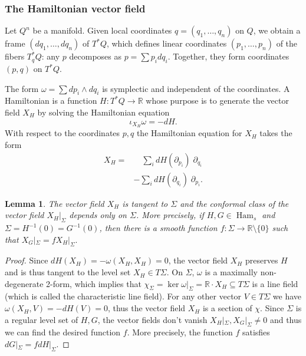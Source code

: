 \documentclass{amsart}
\newcommand{\RR}{\mathbb{R}}
\newcommand{\Ham}{\operatorname{Ham}}
\newtheorem{lemma}[proposition]{Lemma}
\theoremstyle{definition}
\theoremstyle{remark}
\numberwithin{equation}{section}
\begin{document}




\subsubsection{The Hamiltonian vector field}\label{subsubsec:HamVec}

Let $Q^n$ be a manifold. Given local coordinates $q=(q_1,\ldots,q_n)$ on $Q$, we obtain a frame $(dq_1,\ldots,dq_n)$ of $T^*Q$, which defines linear coordinates $(p_1,\ldots, p_n)$ of the fibers $T_q^*Q$: any $p$ decomposes as $p=\sum p_idq_i$. Together, they form coordinates $(p,q)$ on $T^*Q$. 

The form $\omega=\sum dp_i\wedge dq_i$ is symplectic and independent of the coordinates. A Hamiltonian is a function $H:T^*Q\to \RR$ whose purpose is to generate the vector field $X_H$ by solving the Hamiltonian equation 
$$\iota_{X_H}\omega = -dH.$$
With respect to the coordinates $p,q$ the Hamiltonian equation for $X_H$ takes the form 
\begin{align*}
    X_H = &  \quad\sum_i  dH(\partial_{p_i}) \;\partial_{q_i}\\
            &-\sum_i  dH(\partial_{q_i}) \;\partial_{p_i}.
\end{align*}

\begin{lemma}\label{lem:characteristicFlow}
    The vector field $X_H$ is tangent to $\Sigma$ and the conformal class of the vector field $X_H|_\Sigma$ depends only on $\Sigma$. More precisely, if $H,G\in\Ham_s$ and $\Sigma=H^{-1}(0)=G^{-1}(0)$, then there is a smooth function $f:\Sigma\to\RR\setminus \{0\}$ such that $X_G|_\Sigma=fX_H|_\Sigma.$
\end{lemma}
\begin{proof}
    Since $dH(X_H)=-\omega(X_H,X_H)=0$, the vector field $X_H$ preserves $H$ and is thus tangent to the level set $X_H\in T\Sigma$. On $\Sigma$, $\omega$ is a maximally non-degenerate 2-form, which implies that $\chi_\Sigma=\ker\omega|_\Sigma=\RR\cdot X_H\subseteq T\Sigma$ is a line field (which is called the characteristic line field). For any other vector $V\in T\Sigma$ we have $\omega(X_H,V)=-dH(V)=0$, thus the vector field $X_H$ is a section of $\chi$. Since $\Sigma$ is a regular level set of $H,G$, the vector fields don't vanish $X_H|_\Sigma,X_G|_\Sigma\neq 0$ and thus we can find the desired function $f$. More precisely, the function $f$ satisfies $dG|_\Sigma=fdH|_\Sigma$.
\end{proof}
\end{document}
